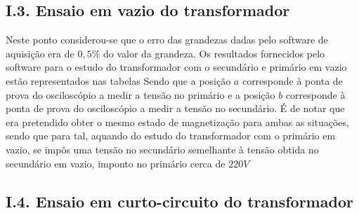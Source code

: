 \documentclass[%
  reprint,
  nofootinbib,
  amsmath,amssymb,
  aps,
  10pt,
]{revtex4-1}
\begin{document}
\subsection*{I.3. Ensaio em vazio do transformador}
Neste ponto considerou-se que o erro das grandezas dadas pelo software de aquisição era de $0,5\%$ do valor da grandeza. Os resultados fornecidos pelo software para o estudo do transformador com o secundário e primário em vazio estão representados nas tabelas
Sendo que a posição $a$ corresponde à ponta de prova do osciloscópio a medir a tensão no primário e a posição $b$ corresponde à ponta de prova do osciloscópio a medir a tensão no secundário.
É de notar que era pretendido obter o mesmo estado de magnetização para ambas as situações, sendo que para tal, aquando do estudo do transformador com o primário em vazio, se impôs uma tensão no secundário semelhante à tensão obtida no secundário em vazio, imponto no primário cerca de $220V$
\subsection*{I.4. Ensaio em curto-circuito do transformador}
\end{document}
